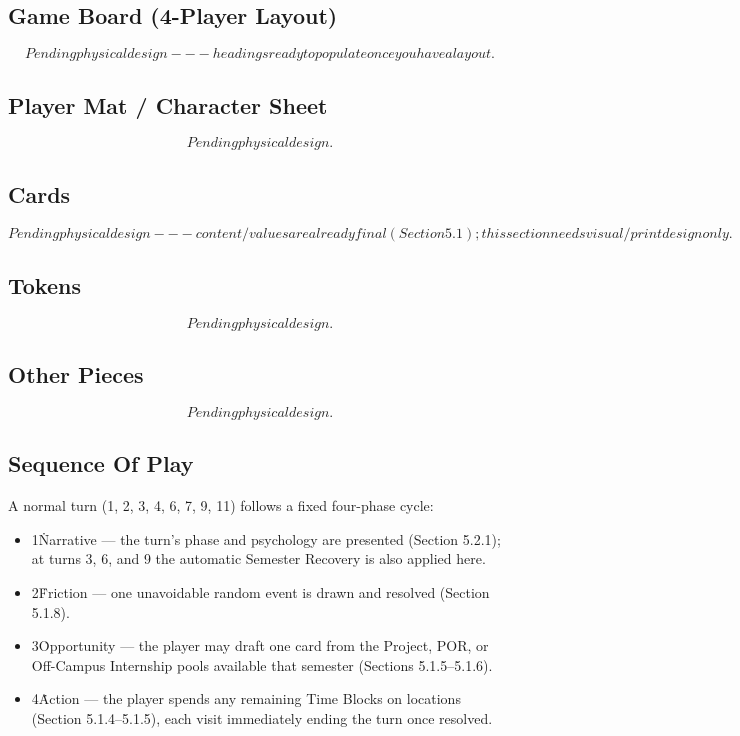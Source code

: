 \subsection{Game Board (4-Player Layout)}

\emph{\[Pending physical design --- headings ready to populate once you have a layout.\]}

\subsection{Player Mat / Character Sheet}

\emph{\[Pending physical design.\]}

\subsection{Cards}

\emph{\[Pending physical design --- content/values are already final (Section 5.1); this section needs visual/print design only.\]}

\subsection{Tokens}

\emph{\[Pending physical design.\]}

\subsection{Other Pieces}

\emph{\[Pending physical design.\]}

\subsection{Sequence Of Play}

A normal turn (1, 2, 3, 4, 6, 7, 9, 11) follows a fixed four-phase cycle:

\begin{itemize}\item 1\. Narrative --- the turn's phase and psychology are presented (Section 5.2.1); at turns 3, 6, and 9 the automatic Semester Recovery is also applied here.\item 2\. Friction --- one unavoidable random event is drawn and resolved (Section 5.1.8).\item 3\. Opportunity --- the player may draft one card from the Project, POR, or Off-Campus Internship pools available that semester (Sections 5.1.5--5.1.6).\item 4\. Action --- the player spends any remaining Time Blocks on locations (Section 5.1.4--5.1.5), each visit immediately ending the turn once resolved.\end{itemize}


